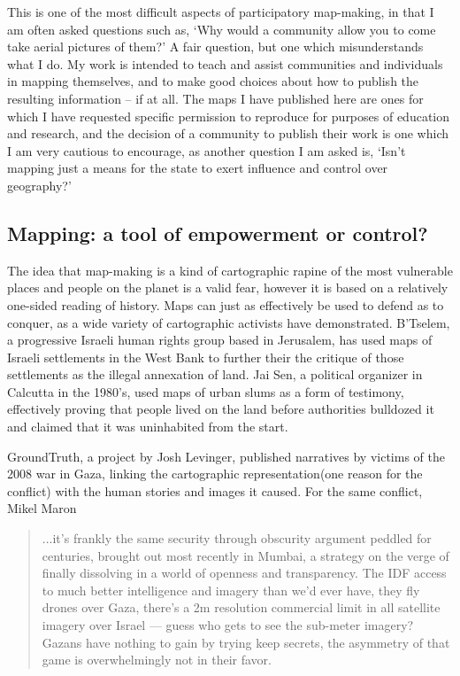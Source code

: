\documentclass[11pt]{report}
\begin{document}
This is one of the most difficult aspects of participatory map-making, in that I am often asked questions such as, `Why would a community allow you to come take aerial pictures of them?' A fair question, but one which misunderstands what I do. My work is intended to teach and assist communities and individuals in mapping themselves, and to make good choices about how to publish the resulting information -- if at all. The maps I have published here are ones for which I have requested specific permission to reproduce for purposes of education and research, and the decision of a community to publish their work is one which I am very cautious to encourage, as another question I am asked is, `Isn't mapping just a means for the state to exert influence and control over geography?' 

\subsection{Mapping: a tool of empowerment or control?}

The idea that map-making is a kind of cartographic rapine of the most vulnerable places and people on the planet is a valid fear, however it is based on a relatively one-sided reading of history. Maps can just as effectively be used to defend as to conquer, as a wide variety of cartographic activists have demonstrated. B'Tselem, a progressive Israeli human rights group based in Jerusalem, has used maps of Israeli settlements in the West Bank to further their the critique of those settlements as the illegal annexation of land. Jai Sen, a political organizer in Calcutta in the 1980's, used maps of urban slums as a form of testimony, effectively proving that people lived on the land before authorities bulldozed it and claimed that it was uninhabited from the start. 

GroundTruth, a project by Josh Levinger, published narratives by victims of the 2008 war in Gaza, linking the cartographic representation(one reason for the conflict) with the human stories and images it caused. For the same conflict, Mikel Maron  

\begin{quote}
...it's frankly the same security through obscurity argument peddled for centuries, brought out most recently in Mumbai, a strategy on the verge of finally dissolving in a world of openness and transparency. The IDF access to much better intelligence and imagery than we'd ever have, they fly drones over Gaza, there's a 2m resolution commercial limit in all satellite imagery over Israel — guess who gets to see the sub-meter imagery? Gazans have nothing to gain by trying keep secrets, the asymmetry of that game is overwhelmingly not in their favor.\cite{maron2009misconceptions}
\end{quote}
\end{document}
